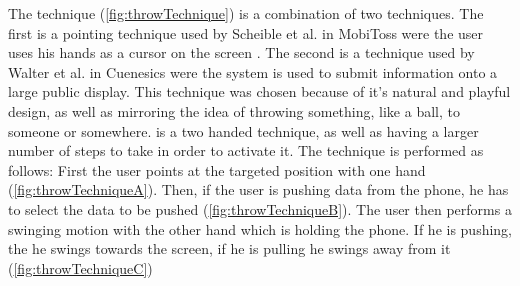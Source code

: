\begin{figure}[H]
	\label{fig:swipeTechnique}
\end{figure}

The \throw technique (\cref{fig:throwTechnique}) is a combination of two techniques.
The first is a pointing technique used by Scheible et al. in MobiToss \cite{Scheible:2008} were the user uses his hands as a cursor on the screen .
The second is a technique used by Walter et al. in Cuenesics \cite{Walter:2014} were the system is used to submit information onto a large public display.
This technique was chosen because of it's natural and playful design, as well as mirroring the idea of throwing something, like a ball, to someone or somewhere.
\throw is a two handed technique, as well as having a larger number of steps to take in order to activate it.
The \throw technique is performed as follows: 
First the user points at the targeted position with one hand (\cref{fig:throwTechniqueA}).
Then, if the user is pushing data from the phone, he has to select the data to be pushed (\cref{fig:throwTechniqueB}).
The user then performs a swinging motion with the other hand which is holding the phone.
If he is pushing, the he swings towards the screen, if he is pulling he swings away from it (\cref{fig:throwTechniqueC}) 


